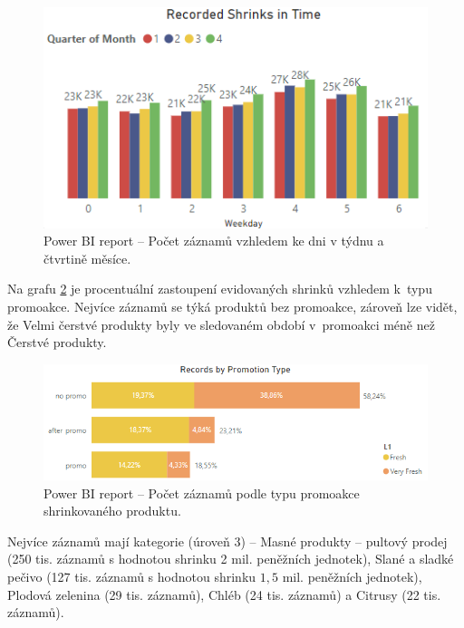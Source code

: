 \begin{figure}[h!]
    \centering
    \captionsetup{justification=centering}
    \includegraphics[width=.6\textwidth]{obrazky/PBI/time.png}
    \caption{Power BI report -- Počet záznamů vzhledem ke dni v týdnu a čtvrtině měsíce.}
    \label{obr:PBI:time}
\end{figure}

Na grafu \ref*{obr:PBI:promo} je procentuální zastoupení evidovaných shrinků vzhledem k~typu promoakce. Nejvíce záznamů se týká produktů bez promoakce, zároveň lze vidět, že Velmi čerstvé  produkty byly ve sledovaném období v~promoakci méně než Čerstvé produkty.

\begin{figure}[h!]
    \centering
    \captionsetup{justification=centering}
    \includegraphics[width=.8\textwidth]{obrazky/PBI/promotype.png}
    \caption{Power BI report -- Počet záznamů podle typu promoakce \\ shrinkovaného produktu.}
    \label{obr:PBI:promo}
\end{figure}

Nejvíce záznamů mají kategorie (úroveň 3) -- Masné produkty -- pultový prodej (250 tis. záznamů s hodnotou shrinku 2 mil. peněžních jednotek), Slané a sladké pečivo (127 tis. záznamů s hodnotou shrinku $1{,}5$ mil. peněžních jednotek), Plodová zelenina (29 tis. záznamů), Chléb (24 tis. záznamů) a Citrusy (22 tis. záznamů). 

